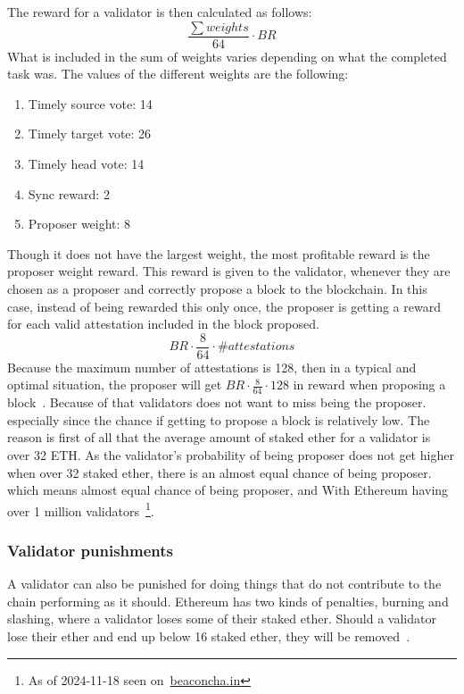 The reward for a validator is then calculated as follows:
\begin{equation}
    \frac{\sum{weights}}{64}\cdot BR
    \label{eq:valrewards}
\end{equation}
What is included in the sum of weights varies depending on what the completed task was.
The values of the different weights are the following:
\begin{enumerate}
    \item Timely source vote: 14
    \item Timely target vote: 26
    \item Timely head vote: 14
    \item Sync reward: 2
    \item Proposer weight: 8
\end{enumerate}
Though it does not have the largest weight, the most profitable reward is the proposer weight reward.
This reward is given to the validator, whenever they are chosen as a proposer and correctly propose a block to the blockchain.
In this case, instead of being rewarded this only once,
the proposer is getting a reward for each valid attestation included in the block proposed.
\begin{equation}
    BR\cdot\frac{8}{64}\cdot \#attestations\label
    {eq:propreward}
\end{equation}
Because the maximum number of attestations is 128,
then in a typical and optimal situation,
the proposer will get $BR\cdot\frac{8}{64}\cdot128$ in reward
when proposing a block~\cite{PoSRewAndPen,consensus-spec-phase-0}.
Because of that validators does not want to miss being the proposer.
especially since the chance if getting to propose a block is relatively low.
 The reason is first of all that the average amount of staked ether for a validator is over 32 ETH\@.
As the validator's probability of being proposer does not get higher when over 32 staked ether, there is an almost equal chance of being proposer.
which means almost equal chance of being proposer, and
With Ethereum having over 1 million validators~\footnote{As of 2024-11-18 seen on~\href{https://beaconcha.in/}{beaconcha.in}}.

\subsubsection{Validator punishments}\label{subsubsec:valpunish}
A validator can also be punished for doing things that do not contribute to the chain performing as it should.
Ethereum has two kinds of penalties, burning and slashing, where a validator loses some of their staked ether\@.
Should a validator lose their ether and end up below 16 staked ether, they will be removed~\cite{consensus-spec-phase-0}.



